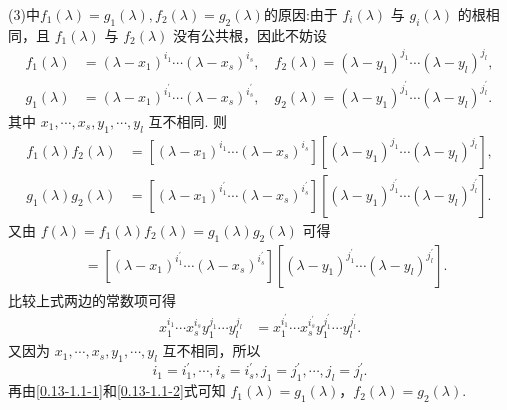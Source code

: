 \documentclass[../../main.tex]{subfiles}
\begin{document}
\begin{remark}
(3)中$f_1(\lambda)=g_1(\lambda),f_2(\lambda)=g_2(\lambda)$的原因:由于 $f_i(\lambda)$ 与 $g_i(\lambda)$ 的根相同，且 $f_1(\lambda)$ 与 $f_2(\lambda)$ 没有公共根，因此不妨设
\begin{align}
f_1(\lambda)&=(\lambda - x_1)^{i_1}\cdots(\lambda - x_s)^{i_s}, \quad f_2(\lambda)=(\lambda - y_1)^{j_1}\cdots(\lambda - y_l)^{j_l},\label{0.13-1.1-1}
\\
g_1(\lambda)&=(\lambda - x_1)^{i_{1}^{\prime}}\cdots(\lambda - x_s)^{i_{s}^{\prime}}, \quad g_2(\lambda)=(\lambda - y_1)^{j_{1}^{\prime}}\cdots(\lambda - y_l)^{j_{l}^{\prime}}.\label{0.13-1.1-2}
\end{align}
其中 $x_1,\cdots,x_s,y_1,\cdots,y_l$ 互不相同. 则
\begin{align*}
f_1(\lambda)f_2(\lambda)&=[(\lambda - x_1)^{i_1}\cdots(\lambda - x_s)^{i_s}][(\lambda - y_1)^{j_1}\cdots(\lambda - y_l)^{j_l}],\\
g_1(\lambda)g_2(\lambda)&=[(\lambda - x_1)^{i_{1}^{\prime}}\cdots(\lambda - x_s)^{i_{s}^{\prime}}][(\lambda - y_1)^{j_{1}^{\prime}}\cdots(\lambda - y_l)^{j_{l}^{\prime}}].
\end{align*}
又由 $f(\lambda)=f_1(\lambda)f_2(\lambda)=g_1(\lambda)g_2(\lambda)$ 可得
\begin{align*}
[(\lambda - x_1)^{i_1}\cdots(\lambda - x_s)^{i_s}][(\lambda - y_1)^{j_1}\cdots(\lambda - y_l)^{j_l}]&=[(\lambda - x_1)^{i_{1}^{\prime}}\cdots(\lambda - x_s)^{i_{s}^{\prime}}][(\lambda - y_1)^{j_{1}^{\prime}}\cdots(\lambda - y_l)^{j_{l}^{\prime}}].
\end{align*}
比较上式两边的常数项可得
\begin{align*}
x_1^{i_1}\cdots x_s^{i_s}y_1^{j_1}\cdots y_l^{j_l}&=x_1^{i_{1}^{\prime}}\cdots x_s^{i_{s}^{\prime}}y_1^{j_{1}^{\prime}}\cdots y_l^{j_{l}^{\prime}}.
\end{align*}
又因为 $x_1,\cdots,x_s,y_1,\cdots,y_l$ 互不相同，所以
\[i_1 = i_{1}^{\prime},\cdots,i_s = i_{s}^{\prime},j_1 = j_{1}^{\prime},\cdots,j_l = j_{l}^{\prime}.\]
再由\eqref{0.13-1.1-1}和\eqref{0.13-1.1-2}式可知 $f_1(\lambda)=g_1(\lambda)$，$f_2(\lambda)=g_2(\lambda)$. 
\end{remark}
\end{document}
